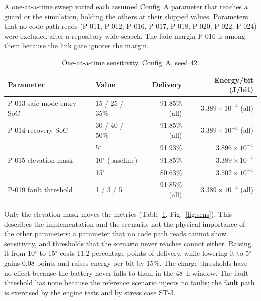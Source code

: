 \documentclass[preprint,12pt]{elsarticle}
\newcommand{\cfgA}{Config~A}
\begin{document}
A one-at-a-time sweep varied each assumed \cfgA{} parameter that reaches a guard or the simulation, holding the others at their shipped values. Parameters that no code path reads (P-011, P-012, P-016, P-017, P-018, P-020, P-022, P-024) were excluded after a repository-wide search. The fade margin P-016 is among them because the link gate ignores the margin.

\begin{table}[t]
\centering
\small
\caption{One-at-a-time sensitivity, \cfgA{}, seed 42.}
\label{tab:sensitivity}
\begin{tabular}{@{}llrr@{}}
\toprule
Parameter & Value & Delivery & Energy/bit (J/bit) \\
\midrule
P-013 safe-mode entry SoC & 15 / 25 / 35\% & 91.85\% (all) & $3.389\times10^{-4}$ (all) \\
P-014 recovery SoC & 30 / 40 / 50\% & 91.85\% (all) & $3.389\times10^{-4}$ (all) \\
\multirow{3}{*}{P-015 elevation mask} & 5$^\circ$ & 91.93\% & $3.896\times10^{-4}$ \\
 & 10$^\circ$ (baseline) & 91.85\% & $3.389\times10^{-4}$ \\
 & 15$^\circ$ & 80.63\% & $3.502\times10^{-4}$ \\
P-019 fault threshold & 1 / 3 / 5 & 91.85\% (all) & $3.389\times10^{-4}$ (all) \\
\bottomrule
\end{tabular}
\end{table}

Only the elevation mask moves the metrics (Table~\ref{tab:sensitivity}, Fig.~\ref{fig:sens}). This describes the implementation and the scenario, not the physical importance of the other parameters: a parameter that no code path reads cannot show sensitivity, and thresholds that the scenario never reaches cannot either. Raising it from 10$^\circ$ to 15$^\circ$ costs 11.2 percentage points of delivery, while lowering it to 5$^\circ$ gains 0.08 points and raises energy per bit by 15\%. The charge thresholds have no effect because the battery never falls to them in the 48~h window. The fault threshold has none because the reference scenario injects no faults; the fault path is exercised by the engine tests and by stress case ST-3.
\end{document}
